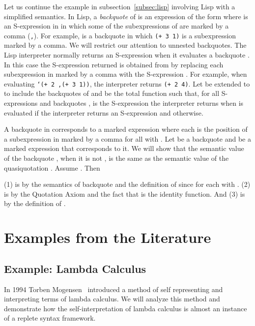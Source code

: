 \documentclass[11pt,fleqn]{article}
\newcommand{\bsp}{\begin{sloppypar}}
\newcommand{\esp}{\end{sloppypar}}
\begin{document}
Let us continue the example in subsection~\ref{subsec:lisp} involving
Lisp with a simplified semantics.  In Lisp, a \emph{backquote} of 
is an expression of the form  where  is an
S-expression in  in which some of the subexpressions of  are
marked by a comma (\texttt{,}).  For example,
 is a backquote in which \texttt{(+ 3 1)} 
is a subexpression marked by a comma.  We will restrict our attention
to unnested backquotes.  The Lisp interpreter normally returns an
S-expression when it evaluates a backquote .  In
this case the S-expression returned is obtained from  by replacing
each subexpression  in  marked by a comma with the S-expression
.  For example, when evaluating \texttt{`(+ 2 ,(+ 3 1))}, the
interpreter returns \mbox{\texttt{(+ 2 4)}}.  Let  be extended to
 to include the backquotes of  and  be the total function such that, for all
S-expressions and backquotes ,  is the
S-expression the interpreter returns when  is evaluated if the
interpreter returns an S-expression and  otherwise.

\bsp A backquote  in  corresponds to a marked
expression 
where each  is the position of a subexpression  in
 marked by a comma for all  with .  Let
 be a backquote and  be a marked
expression that corresponds to it.  We will show that the semantic
value of the backquote , when it is not , is the
same as the semantic value of the quasiquotation .
Assume .  Then
\setcounter{equation}{0}

(1) is by the semantics of backquote and the definition of  since
 for each  with .  (2) is by the
Quotation Axiom and the fact that  is the identity
function.  And (3) is by the definition of . \esp

\section{Examples from the Literature} \label{sec:literature}

\subsection{Example: Lambda Calculus} \label{subsec:lambda}
\newcommand{\betaarrow}{\twoheadrightarrow_{\beta}}
\newcommand{\nflambda}{{\rm NF}_{\Lambda}}
\newcommand{\nfdomain}{\nflambda \cup \{\bot\}}

In 1994 Torben Mogensen~\cite{Mogensen94} introduced a method of self
representing and interpreting terms of lambda calculus. We will
analyze this method and demonstrate how the self-interpretation of
lambda calculus is almost an instance of a replete syntax framework.
\end{document}
